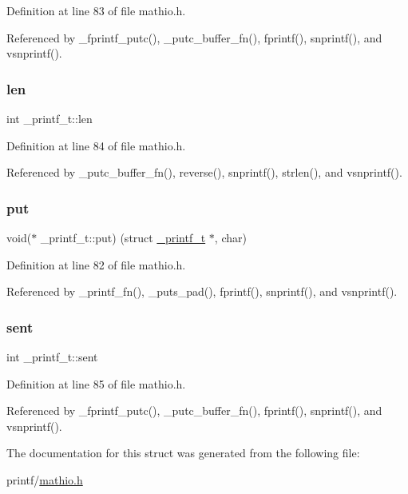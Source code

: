 Definition at line 83 of file mathio.\+h.



Referenced by \+\_\+fprintf\+\_\+putc(), \+\_\+putc\+\_\+buffer\+\_\+fn(), fprintf(), snprintf(), and vsnprintf().

\mbox{\label{struct__printf__t_a5139902cde74159b79e6418a34712bee}} 
\subsubsection{\texorpdfstring{len}{len}}
{\footnotesize\ttfamily int \+\_\+printf\+\_\+t\+::len}



Definition at line 84 of file mathio.\+h.



Referenced by \+\_\+putc\+\_\+buffer\+\_\+fn(), reverse(), snprintf(), strlen(), and vsnprintf().

\mbox{\label{struct__printf__t_a3ef8eb0143b93d4446b04c6ce9313be7}} 
\subsubsection{\texorpdfstring{put}{put}}
{\footnotesize\ttfamily void($\ast$ \+\_\+printf\+\_\+t\+::put) (struct \hyperlink{struct__printf__t}{\+\_\+printf\+\_\+t} $\ast$, char)}



Definition at line 82 of file mathio.\+h.



Referenced by \+\_\+printf\+\_\+fn(), \+\_\+puts\+\_\+pad(), fprintf(), snprintf(), and vsnprintf().

\mbox{\label{struct__printf__t_a872716fd701166cd57bd3fffb7b77706}} 
\subsubsection{\texorpdfstring{sent}{sent}}
{\footnotesize\ttfamily int \+\_\+printf\+\_\+t\+::sent}



Definition at line 85 of file mathio.\+h.



Referenced by \+\_\+fprintf\+\_\+putc(), \+\_\+putc\+\_\+buffer\+\_\+fn(), fprintf(), snprintf(), and vsnprintf().



The documentation for this struct was generated from the following file\+:\begin{DoxyCompactItemize}
\item 
printf/\hyperlink{mathio_8h}{mathio.\+h}\end{DoxyCompactItemize}
